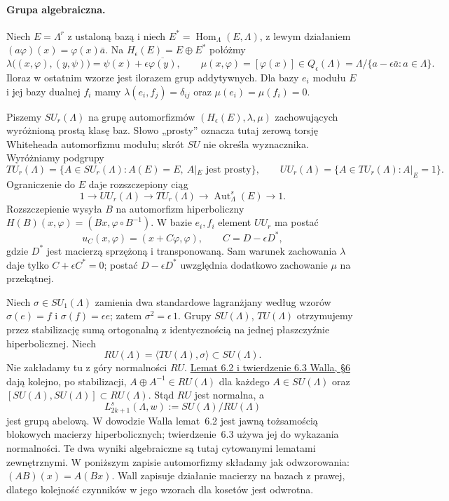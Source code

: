 \paragraph{Grupa algebraiczna.}
Niech $E=\Lambda^r$ z ustaloną bazą i niech
$E^*=\operatorname{Hom}_\Lambda(E,\Lambda)$, z
lewym działaniem $(a\varphi)(x)=\varphi(x)\bar a$.
Na $H_\epsilon(E)=E\oplus E^*$ połóżmy
\[
 \lambda\bigl((x,\varphi),(y,\psi)\bigr)
   =\psi(x)+\epsilon\overline{\varphi(y)},
 \qquad
 \mu(x,\varphi)=[\varphi(x)]\in
 Q_\epsilon(\Lambda)
 =\Lambda/\{a-\epsilon\bar a:a\in\Lambda\}.
\]
Iloraz w ostatnim wzorze jest ilorazem grup
addytywnych. Dla bazy $e_i$ modułu $E$ i jej
bazy dualnej $f_i$ mamy
$\lambda(e_i,f_j)=\delta_{ij}$ oraz
$\mu(e_i)=\mu(f_i)=0$.

Piszemy $SU_r(\Lambda)$ na grupę automorfizmów
$(H_\epsilon(E),\lambda,\mu)$ zachowujących
wyróżnioną prostą klasę baz. Słowo „prosty”
oznacza tutaj zerową torsję Whiteheada
automorfizmu modułu; skrót $SU$ nie określa
wyznacznika. Wyróżniamy podgrupy
\[
 TU_r(\Lambda)=\{A\in SU_r(\Lambda):
             A(E)=E,\ A|_E\text{ jest prosty}\},
 \qquad
 UU_r(\Lambda)=\{A\in TU_r(\Lambda):A|_E=1\}.
\]
Ograniczenie do $E$ daje rozszczepiony ciąg
\[
 1\longrightarrow UU_r(\Lambda)
 \longrightarrow TU_r(\Lambda)
 \longrightarrow\operatorname{Aut}^{s}_\Lambda(E)
 \longrightarrow1.
\]
Rozszczepienie wysyła $B$ na automorfizm
hiperboliczny
$H(B)(x,\varphi)=(Bx,\varphi\circ B^{-1})$.
W bazie $e_i,f_i$ element $UU_r$ ma postać
\[
 u_C(x,\varphi)=(x+C\varphi,\varphi),
 \qquad C=D-\epsilon D^*,
\]
gdzie $D^*$ jest macierzą sprzężoną i
transponowaną. Sam warunek zachowania
$\lambda$ daje tylko $C+\epsilon C^*=0$;
postać $D-\epsilon D^*$ uwzględnia dodatkowo
zachowanie $\mu$ na przekątnej.

Niech $\sigma\in SU_1(\Lambda)$ zamienia dwa
standardowe lagranżjany według wzorów
$\sigma(e)=f$ i $\sigma(f)=\epsilon e$; zatem
$\sigma^2=\epsilon\,1$. Grupy $SU(\Lambda)$,
$TU(\Lambda)$ otrzymujemy przez stabilizację
sumą ortogonalną z identycznością na jednej
płaszczyźnie hiperbolicznej. Niech
\[
 RU(\Lambda)=\langle TU(\Lambda),\sigma\rangle
       \subset SU(\Lambda).
\]
Nie zakładamy tu z góry normalności $RU$.
\href{https://www.maths.ed.ac.uk/~v1ranick/books/scm.pdf}
{Lemat 6.2 i twierdzenie 6.3 Walla, §6}
dają kolejno, po stabilizacji,
$A\oplus A^{-1}\in RU(\Lambda)$ dla każdego
$A\in SU(\Lambda)$ oraz
$[SU(\Lambda),SU(\Lambda)]\subset RU(\Lambda)$.
Stąd $RU$ jest normalna, a
\[
 L^s_{2k+1}(\Lambda,w)
       :=SU(\Lambda)/RU(\Lambda)
\]
jest grupą abelową. W dowodzie Walla lemat~6.2
jest jawną tożsamością blokowych macierzy
hiperbolicznych; twierdzenie~6.3 używa jej do
wykazania normalności. Te dwa wyniki algebraiczne
są tutaj cytowanymi lematami zewnętrznymi.
W poniższym zapisie automorfizmy składamy jak
odwzorowania: $(AB)(x)=A(Bx)$. Wall zapisuje
działanie macierzy na bazach z prawej, dlatego
kolejność czynników w jego wzorach dla kosetów
jest odwrotna.

